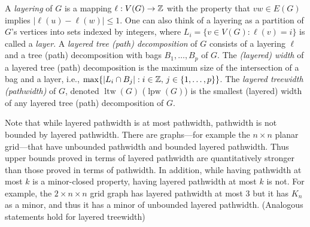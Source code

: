 \documentclass{patmorin}
\DeclareMathOperator{\lpw}{lpw}
\DeclareMathOperator{\ltw}{ltw}
\begin{document}
   A \emph{layering} of $G$ is a mapping $\ell:V(G)\to\mathbb{Z}$ with the
property that $vw\in E(G)$ implies $|\ell(u)-\ell(w)|\le 1$. One
can also think of a layering as a partition of $G$'s vertices into
sets indexed by integers, where $L_i=\{v\in V(G)
: \ell(v)=i\}$ is called a  \emph{layer}.  A \emph{layered tree (path) decomposition} of $G$ consists
of a layering $\ell$ and a tree (path) decomposition with bags $B_1,\ldots,B_p$ of $G$.
The \emph{(layered) width} of a layered tree (path) decomposition is the maximum
size of the intersection of a bag and a layer, i.e., $\max\{|L_i\cap
B_j|:i\in\mathbb{Z},\, j\in\{1,\ldots,p\}\}$.  The \emph{layered treewidth (pathwidth)} of
$G$, denoted $\ltw(G)$ ($\lpw(G)$) is the smallest (layered) width of any layered
tree (path) decomposition of $G$.

Note that while layered pathwidth is at most pathwidth, pathwidth is
not bounded by layered pathwidth. There are graphs---for example the $n \times
n$ planar grid---that have unbounded pathwidth and bounded layered
pathwidth. Thus upper bounds proved in terms of layered pathwidth are
quantitatively stronger than those proved in terms of pathwidth. In addition, while having pathwidth at most $k$ is a minor-closed property, having layered pathwidth at most $k$ is not.  For
example, the $2 \times n \times n$ grid graph has layered pathwidth at most $3$ but
it has  $K_n$ as a minor, and thus it has a minor of unbounded layered pathwidth. (Analogous statements hold for layered treewidth)


\end{document}
